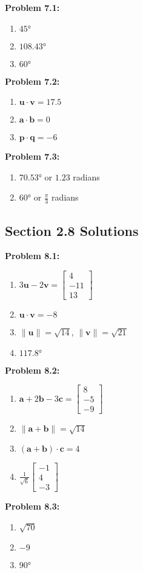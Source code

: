 \documentclass{article}
\begin{document}
\textbf{Problem 7.1:}
\begin{enumerate}
\item $45°$
\item $108.43°$
\item $60°$
\end{enumerate}

\textbf{Problem 7.2:}
\begin{enumerate}
\item $\mathbf{u} \cdot \mathbf{v} = 17.5$
\item $\mathbf{a} \cdot \mathbf{b} = 0$
\item $\mathbf{p} \cdot \mathbf{q} = -6$
\end{enumerate}

\textbf{Problem 7.3:}
\begin{enumerate}
\item $70.53°$ or $1.23$ radians
\item $60°$ or $\frac{\pi}{3}$ radians
\end{enumerate}

\subsection{Section 2.8 Solutions}

\textbf{Problem 8.1:}
\begin{enumerate}
\item $3\mathbf{u} - 2\mathbf{v} = \begin{bmatrix} 4 \\ -11 \\ 13 \end{bmatrix}$
\item $\mathbf{u} \cdot \mathbf{v} = -8$
\item $\|\mathbf{u}\| = \sqrt{14}$, $\|\mathbf{v}\| = \sqrt{21}$
\item $117.8°$
\end{enumerate}

\textbf{Problem 8.2:}
\begin{enumerate}
\item $\mathbf{a} + 2\mathbf{b} - 3\mathbf{c} = \begin{bmatrix} 8 \\ -5 \\ -9 \end{bmatrix}$
\item $\|\mathbf{a} + \mathbf{b}\| = \sqrt{14}$
\item $(\mathbf{a} + \mathbf{b}) \cdot \mathbf{c} = 4$
\item $\frac{1}{\sqrt{6}}\begin{bmatrix} -1 \\ 4 \\ -3 \end{bmatrix}$
\end{enumerate}

\textbf{Problem 8.3:}
\begin{enumerate}
\item $\sqrt{70}$
\item $-9$
\item $90°$
\end{enumerate}
\end{document}

